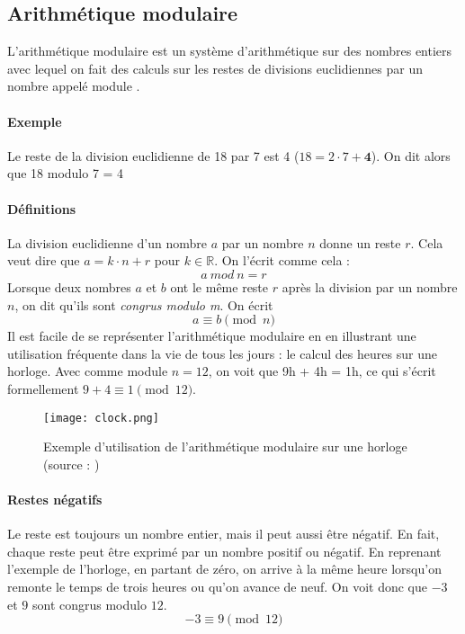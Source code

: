 \documentclass[10pt,a4paper,twoside]{article}
\numberwithin{equation}{section}
\begin{document}
	
	\subsection{Arithmétique modulaire} \label{modular_arithmetic}
		L'arithmétique modulaire est un système d'arithmétique sur des nombres entiers avec lequel on fait des calculs sur les restes de divisions euclidiennes par un nombre appelé module \cite{wiki:modular_arithmetic}.
		\paragraph{Exemple}
			Le reste de la division euclidienne de 18 par 7 est 4 ($18 = 2 \cdot 7 + \textbf{4}$). On dit alors que 18 modulo 7 = 4
		\paragraph{Définitions}
			La division euclidienne d'un nombre $a$ par un nombre $n$ donne un reste $r$. Cela veut dire que $a = k\cdot n + r$ pour $k \in \mathbb{R}$. On l'écrit comme cela :
			\begin{equation}
				a\ mod\ n = r
			\end{equation}
			Lorsque deux nombres $a$ et $b$ ont le même reste $r$ après la division par un nombre $n$, on dit qu'ils sont \textit{congrus modulo m}. On écrit
			\begin{equation}
				a \equiv b \pmod n
			\end{equation}
			Il est facile de se représenter l'arithmétique modulaire en en illustrant une utilisation fréquente dans la vie de tous les jours : le calcul des heures sur une horloge. Avec comme module $n = 12$, on voit que 9h + 4h = 1h, ce qui s'écrit formellement $9 + 4 \equiv 1 \pmod{12}$.
			
			\begin{figure}[H] \label{clock}
				\centering
				\texttt{[image: clock.png]}
				\caption{Exemple d'utilisation de l'arithmétique modulaire sur une horloge (source : \cite{wiki:modular_arithmetic})}
			\end{figure}
			
		\paragraph{Restes négatifs}
			Le reste est toujours un nombre entier, mais il peut aussi être négatif. En fait, chaque reste peut être exprimé par un nombre positif ou négatif. En reprenant l'exemple de l'horloge, en partant de zéro, on arrive à la même heure lorsqu'on remonte le temps de trois heures ou qu'on avance de neuf. On voit donc que $-3$ et $9$ sont congrus modulo $12$.
			\begin{equation}
				-3 \equiv 9 \pmod{12}
			\end{equation}
\end{document}
